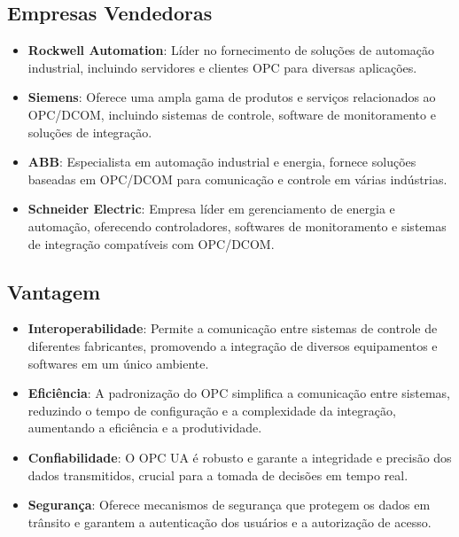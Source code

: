 \documentclass[a4paper,11pt]{article} %
\begin{document}
\subsection{Empresas Vendedoras}
\begin{itemize}
    \item \textbf{Rockwell Automation}: Líder no fornecimento de soluções de automação industrial, incluindo servidores e clientes OPC para diversas aplicações.
    \item \textbf{Siemens}: Oferece uma ampla gama de produtos e serviços relacionados ao OPC/DCOM, incluindo sistemas de controle, software de monitoramento e soluções de integração.
    \item \textbf{ABB}: Especialista em automação industrial e energia, fornece soluções baseadas em OPC/DCOM para comunicação e controle em várias indústrias.
    \item \textbf{Schneider Electric}: Empresa líder em gerenciamento de energia e automação, oferecendo controladores, softwares de monitoramento e sistemas de integração compatíveis com OPC/DCOM.
\end{itemize}

\subsection{Vantagem}
\begin{itemize}
    \item \textbf{Interoperabilidade}: Permite a comunicação entre sistemas de controle de diferentes fabricantes, promovendo a integração de diversos equipamentos e softwares em um único ambiente.
    \item \textbf{Eficiência}: A padronização do OPC simplifica a comunicação entre sistemas, reduzindo o tempo de configuração e a complexidade da integração, aumentando a eficiência e a produtividade.
    \item \textbf{Confiabilidade}: O OPC UA é robusto e garante a integridade e precisão dos dados transmitidos, crucial para a tomada de decisões em tempo real.
    \item \textbf{Segurança}: Oferece mecanismos de segurança que protegem os dados em trânsito e garantem a autenticação dos usuários e a autorização de acesso.
\end{itemize}
\end{document}
